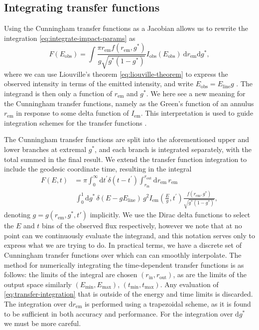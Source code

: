 \documentclass[fleqn,usenatbib]{mnras}
\renewcommand{\d}{\text{d}}
\begin{document}
\subsection{Integrating transfer functions}
\label{sec:transfer-function-integration}

Using the Cunningham transfer functions as a Jacobian allows us to rewrite the
integration \eqref{eq:integrate-impact-params} as
\begin{equation}
    F(E_\text{obs}) = \int \frac{\pi r_\text{em} f(r_\text{em}, g^\ast)}{g \sqrt{g^\ast (1 - g^\ast)}}
    I_\text{obs}(E_\text{obs}) \ \d r_\text{em} \d g^\ast,
\end{equation}
where we can use Liouville's theorem \eqref{eq:liouville-theorem} to express the
observed intensity in terms of the emitted intensity, and write $E_\text{obs} =
E_\text{line}g$ . The integrand is then only a function of $r_\text{em}$ and
$g^\ast$. We here see a new meaning for the Cunningham transfer functions,
namely as the Green's function of an annulus $r_\text{em}$ in response to some
delta function of $I_\text{em}$. This interpretation is used to guide
integration schemes for the transfer functions \citep{dauser_broad_2010}.

The Cunningham transfer functions are split into the aforementioned
upper and lower branches at extremal $g^\ast$, and each branch is integrated
separately, with the total summed in the final result. We extend the transfer
function integration to include the geodesic coordinate time, resulting in the
integral
\begin{align}
    \label{eq:transfer-integration}
    F(E, t) &=
    \pi
    \int_0^\infty \d t^\prime \delta(t - t^\prime)
    \int_{r_\text{in}}^{r_\text{out}} \d r_\text{em}\,r_\text{em} \nonumber \\
    &\ \int_0^1 \d g^\ast\, \delta(E - gE_\text{line})\, g^2 I_\text{em}\left(\frac{E}{g}, t^\prime\right) \frac{f(r_\text{em}, g^\ast)}{\sqrt{g^\ast (1 - g^\ast)}},
\end{align}
denoting $g = g( r_\text{em}, g^\ast, t')$ implicitly. We use the Dirac delta
functions to select the $E$ and $t$ bins of the observed flux respectively,
however we note that at no point can we continuously evaluate the integrand, and
this notation serves only to express what we are trying to do. In practical
terms, we have a discrete set of Cunningham transfer functions over which can
can smoothly interpolate. The method for numerically integrating the
time-dependent transfer functions is as follows: the limits of the integral are
chosen $(r_\text{in}, r_\text{out})$, as are the limits of the output space
similarly $(E_\text{min}, E_\text{max})$, $(t_\text{min}, t_\text{max})$. Any
evaluation of \eqref{eq:transfer-integration} that is outside of the energy and
time limits is discarded. The integration over $\d r_\text{em}$ is performed
using a trapezoidal scheme, as it is found to be sufficient in both accuracy and
performance. For the integration over $\d g^\ast$ we must be more careful.
\end{document}
